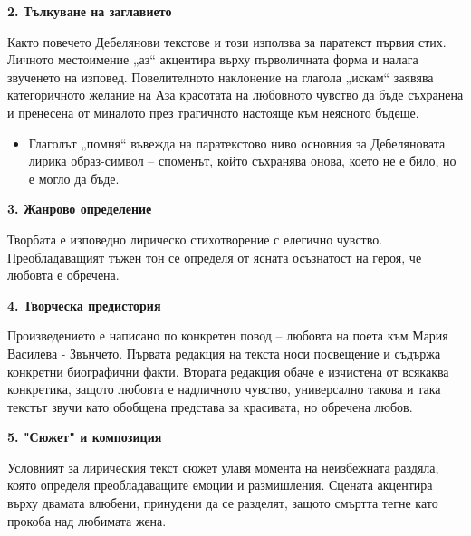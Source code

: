 \documentclass[12pt,a4paper]{article}
\begin{document}
\vspace{0.1cm}
 
\noindent 
\textbf{2. Тълкуване на заглавието}
\vspace{0.1cm}
 
\indent Както повечето Дебелянови текстове и този използва за паратекст първия стих. Личното местоимение „аз“ акцентира върху първоличната форма и налага звученето на изповед. Повелителното наклонение на глагола „искам“ заявява категоричното желание на Аза красотата на любовното чувство да бъде съхранена и пренесена от миналото през трагичното настояще към неясното бъдеще. 

\begin{itemize}[leftmargin=*]
\vspace{-0.2cm}
\item Глаголът „помня“ въвежда на паратекстово ниво основния за Дебеляновата лирика образ-символ – споменът, който съхранява онова, което не е било, но е могло да бъде.
\end{itemize}

\vspace{0.1cm}
 
\noindent 
\textbf{3. Жанрово определение}
\vspace{0.1cm}
 
\indent Творбата е изповедно лирическо стихотворение с елегично чувство. Преобладаващият тъжен тон се определя от ясната осъзнатост на героя, че любовта е обречена.

\vspace{0.1cm}
 
\noindent 
\textbf{4. Творческа предистория}
\vspace{0.1cm}
  
\indent Произведението е написано по конкретен повод – любовта на поета към Мария Василева -  Звънчето. Първата редакция на текста носи посвещение и съдържа конкретни биографични факти. Втората редакция обаче е изчистена от всякаква конкретика, защото любовта е надличното чувство, универсално такова и така текстът звучи като обобщена представа за красивата, но обречена любов.

\vspace{0.1cm}
 
\noindent 
\textbf{5. "Сюжет" и композиция}
\vspace{0.1cm}
  
\indent Условният за лирическия текст сюжет улавя момента на неизбежната раздяла, която определя преобладаващите емоции и размишления. Сцената акцентира върху  двамата влюбени, принудени да се разделят, защото смъртта тегне като прокоба над любимата жена.
\end{document}

